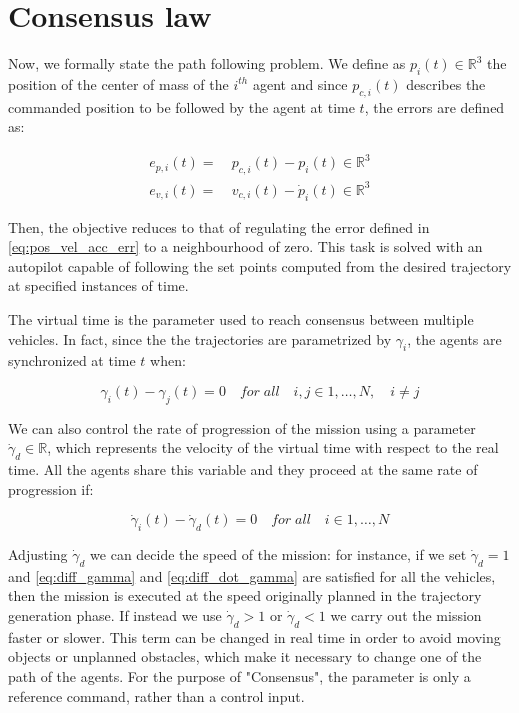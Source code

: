 \section{Consensus law\label{sec:consensus_law}}

Now, we formally state the path following problem. We define as $p_i(t) \in \mathbb{R}^3$
the position of the center of mass of the $i^{th}$ agent and since $p_{c,i}(t)$
describes the commanded position to be followed by the agent at time $t$, the errors
are defined as:

\begin{equation}  \label{eq:pos_vel_acc_err}
  \begin{aligned}
  e_{p,i}(t) = \ & p_{c,i}(t) - p_i(t) \in  \mathbb{R}^3\\
  e_{v,i}(t) = \ & v_{c,i}(t) - \dot{p}_i(t) \in  \mathbb{R}^3
  \end{aligned}
\end{equation}

Then, the objective reduces to that of regulating the error defined in \eqref{eq:pos_vel_acc_err}
to a neighbourhood of zero.
This task is solved with an autopilot capable of following the set points computed
from the desired trajectory at specified instances of time.

The virtual time is the parameter used to reach consensus between multiple vehicles.
In fact, since the the trajectories are parametrized by $\gamma_i$, the agents are
synchronized at time $t$ when:

\begin{equation} \label{eq:diff_gamma}
  \gamma_i(t) - \gamma_j(t) = 0 \quad for \; all \quad i,j \in {1 , \dots , N}, \quad i \neq j
\end{equation}

We can also control the rate of progression of the mission using a parameter
$\dot{\gamma}_d \in \mathbb{R}$, which represents the velocity of the virtual time
with respect to the real time. All the agents share this variable and they proceed
at the same rate of progression if:

\begin{equation} \label{eq:diff_dot_gamma}
  \dot{\gamma}_i(t) - \dot{\gamma}_d(t) = 0 \quad for \; all \quad i \in {1 , \dots , N}
\end{equation}

Adjusting $\dot{\gamma}_d$ we can decide the speed of the mission: for instance,
if we set $\dot{\gamma}_d = 1$ and \eqref{eq:diff_gamma} and \eqref{eq:diff_dot_gamma}
are satisfied for all the vehicles, then the mission is executed at the speed
originally planned in the trajectory generation phase.
If instead we use $\dot{\gamma}_d > 1$ or $\dot{\gamma}_d < 1$ we carry out the
mission faster or slower.
This term can be changed in real time in order to avoid moving objects or
unplanned obstacles, which make it necessary to change one of the path of the agents.
For the purpose of "Consensus", the parameter is only a reference command,
rather than a control input.

